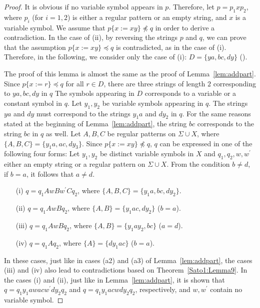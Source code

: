 \begin{proof}
It is obvious if no variable symbol appears in $p$.
Therefore, let $p=p_{1}xp_{2}$, where $p_{i}$ (for $i=1,2$) is either a regular pattern or an empty string, and $x$ is a variable symbol.
We assume that $p \{ x := xy \} \not \preceq q$ in order to derive a contradiction.
In the case of \textrm{(ii)}, by reversing the strings $p$ and $q$, we can prove that the assumption $p \{ x := xy \} \preceq q$ is contradicted, as in the case of \textrm{(i)}.
Therefore, in the following, we consider only the case of \textrm{(i)}: $D=\{ ya, bc, dy \}$ (\TheConditionB).

The proof of this lemma is almost the same as the proof of Lemma~\ref{lem:addpart}.
Since $p \{ x := r \} \preceq q$ for all $r \in D$, there are three strings of length $2$ corresponding to $ya, bc, dy$ in $q$
The symbols appearing in $D$ corresponds to a variable or a constant symbol in $q$.
Let $y_{1}, y_{2}$ be variable symbols appearing in $q$.
The strings $ya$ and $dy$ must correspond to the strings $y_{1}a$ and $dy_{2}$ in $q$.
For the same reasons stated at the beginning of Lemma~\ref{lem:addpart}, the string $bc$ corresponds to the string $bc$ in $q$ as well.
Let $A,B,C$ be regular patterns on $\Sigma \cup X$, where $\{ A,B,C \} = \{ y_{1}a,ac,dy_{3} \}$.
Since $p \{ x := xy \} \not \preceq q$, $q$ can be expressed in one of the following four forms: Let $y_{1}, y_{2}$ be distinct variable symbols in $X$ and $q_{1}, q_{2}, w, w^{\prime}$ either an empty string or a regular pattern on $\Sigma\cup X$. From the condition $b \not= d$, if $b = a$, it follows that $a \not= d$.
\begin{enumerate}
\item[(i)] $q=q_{1}AwBw^{\prime}Cq_{2}$, where $\{ A,B,C \} = \{ y_{1}a,bc,dy_{2} \}$.
\item[(ii)] $q=q_{1}AwBq_{2}$, where $\{ A,B \} = \{ y_{1}ac,dy_{2} \}$ ($b = a$).
\item[(iii)] $q=q_{1}AwBq_{2}$, where $\{ A,B \} = \{ y_{1}ay_{2},bc \}$ ($a = d$).
\item[(iv)] $q=q_{1}Aq_{2}$, where $\{A\} = \{dy_{1}ac\}$ ($b = a$).
\end{enumerate}

In these cases, just like in cases (a2) and (a3) of Lemma~\ref{lem:addpart}, the cases (iii) and (iv) also lead to contradictions based on Theorem~\ref{Sato1:Lemma9}.
In the cases (i) and (ii), just like in Lemma~\ref{lem:addpart}, it is shown that $q=q_{1}y_{1}awacw^{\prime}dy_{2}q_{2}$ and $q=q_{1}y_{1}acwdy_{2}q_{2}$, respectively, and $w,w^{\prime}$ contain no variable symbol.


\end{proof}
